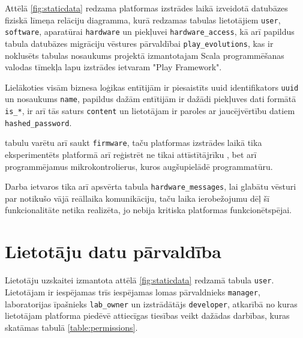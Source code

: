 Attēlā \ref{fig:staticdata} redzama platformas izstrādes laikā izveidotā
datubāzes fiziskā līmeņa relāciju diagramma, kurā redzamas tabulas lietotājiem
\lstinline!user!,  \lstinline!software!,
aparatūrai \lstinline!hardware! un  piekļuvei
\lstinline!hardware_access!, kā arī papildus tabula datubāzes migrāciju vēstures
pārvaldībai \lstinline!play_evolutions!, kas ir noklusēts tabulas nosaukums
projektā izmantotajam Scala programmēšanas valodas tīmekļa lapu izstrādes
ietvaram "Play Framework".

Lielākoties visām biznesa loģikas entītijām ir piesaistīts \gls{uuid}
identifikators \lstinline!uuid! un nosaukums \lstinline!name!, papildus dažām
entītijām ir dažādi piekļuves dati formātā \lstinline!is_*!,
 ir arī tās saturs \lstinline!content! un
lietotājam ir paroles ar jaucējvērtību datiem \lstinline!hashed_password!.

 tabulu varētu arī saukt
\lstinline!firmware!, taču platformas izstrādes laikā tika eksperimentēts
platformā arī reģistrēt ne tikai attīstītājrīku , bet
arī programmējamus mikrokontrolierus, kuros augšupielādē programmatūru.

Darba ietvaros tika arī apsvērta tabula \lstinline!hardware_messages!, lai
glabātu vēsturi par notikušo vājā reāllaika komunikāciju, taču laika
ierobežojumu dēļ šī funkcionalitāte netika realizēta, jo nebija kritiska
platformas funkcionētspējai.

\section{Lietotāju datu pārvaldība}
\label{sec:usermgmt}

Lietotāju uzskaitei izmantota attēlā \ref{fig:staticdata} redzamā tabula
\lstinline!user!. Lietotājam ir iespējamas trīs iespējamas lomas pārvaldnieks
\lstinline!manager!, laboratorijas īpašnieks \lstinline!lab_owner! un
izstrādātājs \lstinline!developer!, atkarībā no kuras lietotājam platforma
piedēvē attiecīgas tiesības veikt dažādas darbības, kuras skatāmas tabulā
\ref{table:permissions}.

